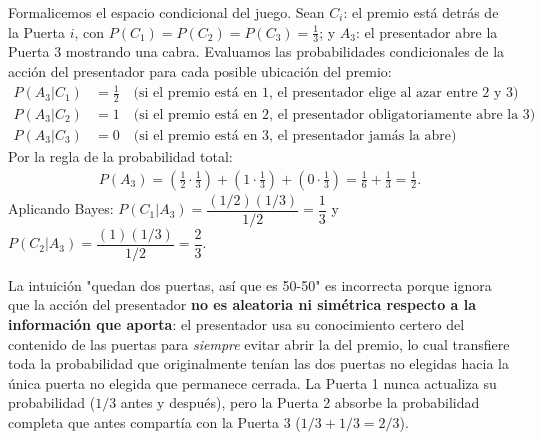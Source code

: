 \begin{solproblema}[prob:c840e8f]
	Formalicemos el espacio condicional del juego. Sean $C_i$: el premio está detrás de la Puerta $i$, con $P(C_1)=P(C_2)=P(C_3)=\frac{1}{3}$; y $A_3$: el presentador abre la Puerta 3 mostrando una cabra. Evaluamos las probabilidades condicionales de la acción del presentador para cada posible ubicación del premio:
	\begin{align}
		P(A_3 | C_1) &= \frac{1}{2} \quad \text{(si el premio está en 1, el presentador elige al azar entre 2 y 3)} \\
		P(A_3 | C_2) &= 1 \quad \text{(si el premio está en 2, el presentador obligatoriamente abre la 3)} \\
		P(A_3 | C_3) &= 0 \quad \text{(si el premio está en 3, el presentador jamás la abre)}
	\end{align}
	Por la regla de la probabilidad total:
	\begin{align}
		P(A_3) = \left(\frac{1}{2} \cdot \frac{1}{3}\right) + \left(1 \cdot \frac{1}{3}\right) + \left(0 \cdot \frac{1}{3}\right) = \frac{1}{6} + \frac{1}{3} = \frac{1}{2}.
	\end{align}
	Aplicando Bayes: $P(C_1|A_3) = \dfrac{(1/2)(1/3)}{1/2} = \dfrac{1}{3}$ y $P(C_2|A_3) = \dfrac{(1)(1/3)}{1/2} = \dfrac{2}{3}$.

	La intuición "quedan dos puertas, así que es 50-50" es incorrecta porque ignora que la acción del presentador \textbf{no es aleatoria ni simétrica respecto a la información que aporta}: el presentador usa su conocimiento certero del contenido de las puertas para \emph{siempre} evitar abrir la del premio, lo cual transfiere toda la probabilidad que originalmente tenían las dos puertas no elegidas hacia la única puerta no elegida que permanece cerrada. La Puerta 1 nunca actualiza su probabilidad ($1/3$ antes y después), pero la Puerta 2 absorbe la probabilidad completa que antes compartía con la Puerta 3 ($1/3+1/3=2/3$).
\end{solproblema}

